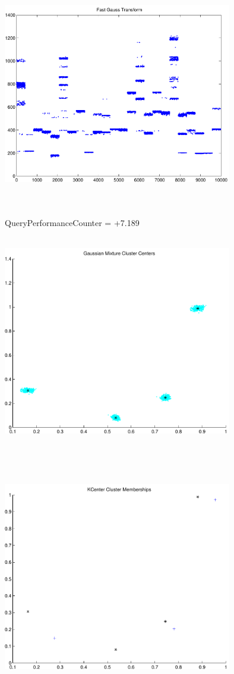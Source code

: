 \documentclass[9pt]{article}
\theoremstyle{plain}
\theoremstyle{definition}
\theoremstyle{remark}
\numberwithin{equation}{section}
\begin{document}
\includegraphics[width=10.0cm,height=10.0cm]{FGT24_Centers.pdf}

QueryPerformanceCounter  =  +7.189
\includegraphics[width=10.0cm,height=10.0cm]{GaussianMixture_ClusterCenters4_Centers.pdf}

\includegraphics[width=10.0cm,height=10.0cm]{KCenterClusterMemberships_4_Centers.pdf}
\end{document}
